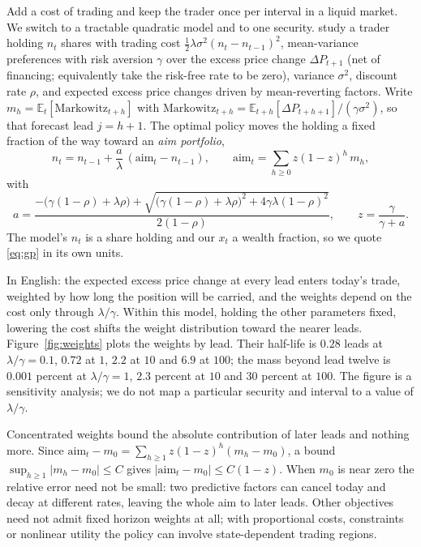 \documentclass[11pt]{article}
\newcommand{\E}{\mathbb{E}}
\begin{document}
Add a cost of trading and keep the trader once per interval in a liquid market. We switch to a tractable quadratic model and to one security. \citet{garleanu2013} study a trader holding $n_t$ shares with trading cost $\tfrac{1}{2}\lambda\sigma^2 (n_t - n_{t-1})^2$, mean-variance preferences with risk aversion $\gamma$ over the excess price change $\Delta P_{t+1}$ (net of financing; equivalently take the risk-free rate to be zero), variance $\sigma^2$, discount rate $\rho$, and expected excess price changes driven by mean-reverting factors. Write $m_h = \E_t[\mathrm{Markowitz}_{t+h}]$ with $\mathrm{Markowitz}_{t+h} = \E_{t+h}[\Delta P_{t+h+1}]/(\gamma\sigma^2)$, so that forecast lead $j = h + 1$. The optimal policy moves the holding a fixed fraction of the way toward an \emph{aim portfolio},
\begin{equation}
n_t = n_{t-1} + \frac{a}{\lambda}\,(\mathrm{aim}_t - n_{t-1}), \qquad
\mathrm{aim}_t = \sum_{h \ge 0} z(1-z)^h\, m_h,
\label{eq:gp}
\end{equation}
with
\[
a = \frac{-\big(\gamma(1-\rho) + \lambda\rho\big) + \sqrt{\big(\gamma(1-\rho) + \lambda\rho\big)^2 + 4\gamma\lambda(1-\rho)^2}}{2(1-\rho)}, \qquad z = \frac{\gamma}{\gamma + a}.
\]
The model's $n_t$ is a share holding and our $x_t$ a wealth fraction, so we quote \eqref{eq:gp} in its own units.

In English: the expected excess price change at every lead enters today's trade, weighted by how long the position will be carried, and the weights depend on the cost only through $\lambda/\gamma$. Within this model, holding the other parameters fixed, lowering the cost shifts the weight distribution toward the nearer leads. Figure~\ref{fig:weights} plots the weights by lead. Their half-life is $0.28$ leads at $\lambda/\gamma = 0.1$, $0.72$ at $1$, $2.2$ at $10$ and $6.9$ at $100$; the mass beyond lead twelve is $0.001$ percent at $\lambda/\gamma = 1$, $2.3$ percent at $10$ and $30$ percent at $100$. The figure is a sensitivity analysis; we do not map a particular security and interval to a value of $\lambda/\gamma$.

Concentrated weights bound the absolute contribution of later leads and nothing more. Since $\mathrm{aim}_t - m_0 = \sum_{h \ge 1} z(1-z)^h (m_h - m_0)$, a bound $\sup_{h \ge 1} |m_h - m_0| \le C$ gives $|\mathrm{aim}_t - m_0| \le C(1-z)$. When $m_0$ is near zero the relative error need not be small: two predictive factors can cancel today and decay at different rates, leaving the whole aim to later leads. Other objectives need not admit fixed horizon weights at all; with proportional costs, constraints or nonlinear utility the policy can involve state-dependent trading regions.
\end{document}
